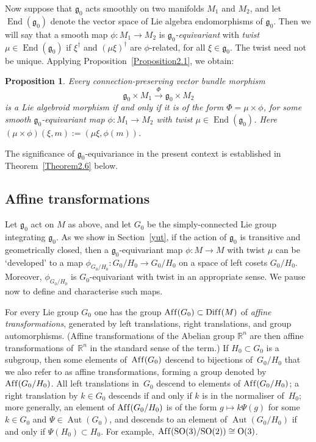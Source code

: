 \documentclass[pdftex]{sigma}
\DeclareMathOperator{\affine}{Af\/f}
\DeclareMathOperator{\diff}{Dif\/f}
\DeclareMathOperator{\automorphism}{Aut}
\DeclareMathOperator{\selfmorphism}{End}
\numberwithin{equation}{section}
\newtheorem{PropositionBlaom}[TheoremBlaom]{Proposition}
 { \theoremstyle{definition}
\newtheorem{CounterexampleBlaom}[TheoremBlaom]{Counterexample}
\newtheorem{RemarkBlaom}[TheoremBlaom]{Remark} }
\begin{document}
Now suppose that ${\mathfrak g}_0 $ acts smoothly on two manifolds
$M_1$ and $M_2$, and let $\selfmorphism({\mathfrak g}_0)$ denote the
vector space of Lie algebra endomorphisms of ${\mathfrak g}_0$. Then
we will say that a smooth map $\phi \colon M_1 \rightarrow M_2$ is
{\it ${\mathfrak g}_0$-equivariant} with {\it twist
  $\mu\in\selfmorphism({\mathfrak g}_0)$} if $\xi^\dagger$ and $(\mu
\xi)^\dagger$ are $\phi $-related, for all $\xi\in {\mathfrak g}_0
$. The twist need not be unique.  Applying Proposition~\ref{Proposition2.1}, we
obtain:

\begin{PropositionBlaom}\label{Proposition2.2}
  Every connection-preserving vector bundle morphism
  \[
  {\mathfrak g}_0
  \times M_1 \xrightarrow{\Phi} {\mathfrak g}_0 \times M_2
  \]
 is a Lie
  algebroid morphism if and only if it is of the form $\Phi=\mu \times
  \phi$, for some smooth ${\mathfrak g}_0$-equivariant map $\phi
  \colon M_1 \rightarrow M_2$ with twist $\mu \in
  \selfmorphism({\mathfrak g}_0)$. Here $(\mu \times \phi)(\xi,m):=(\mu \xi,\phi(m))$.
\end{PropositionBlaom}


The signif\/icance of ${\mathfrak g}_0$-equivariance in the present
context is established in Theorem~\ref{Theorem2.6} below.

\subsection{Af\/f\/ine transformations}\label{affine}
Let ${\mathfrak g}_0$ act on $M$ as above, and let $G_0$ be the
simply-connected Lie group integrating ${\mathfrak g}_0$. As we show
in Section~\ref{yut}, if the action of ${\mathfrak g}_0$ is transitive and
geometrically closed, then a ${\mathfrak g}_0$-equivariant map $\phi
\colon M \rightarrow M$ with twist $\mu$ can be `developed' to a map
$\phi_{G_0/H_0} \colon G_0/H_0 \rightarrow G_0/H_0$ on a space of left
cosets $G_0/H_0$. Moreover, $\phi_{G_0/H_0}$ is $G_0$-equivariant with
twist in an appropriate sense. We pause now to def\/ine and characterise
such maps.

For every Lie group $G_0$ one has the group $\affine(G_0)\subset
\diff(M)$ of {\it affine transformations}, generated by left
translations, right translations, and group automorphisms. (Af\/f\/ine
transformations of the Abelian group ${\mathbb R}^n$ are then af\/f\/ine
transformations of~${\mathbb R}^n $ in the standard sense of the
term.) If $H_0 \subset G_0$ is a subgroup, then some elements of~$\affine(G_0)$ descend to bijections of~$G_0/H_0$ that we also refer
to as af\/f\/ine transformations, forming a group denoted by
$\affine(G_0/H_0)$. All left translations in~$G_0$ descend to elements
of $\affine(G_0/H_0)$; a right translation by $k \in G_0$ descends if
and only if $k$ is in the normaliser of~$H_0$; more generally, an
element of $\affine(G_0/H_0)$ is of the form $g \mapsto k\Psi(g)$ for
some $k \in G_0$ and $\Psi \in \automorphism(G_0)$, and descends to an
element of $\automorphism(G_0/H_0)$ if and only if $\Psi(H_0) \subset
H_0$. For example, $\affine({\rm SO}(3)/{\rm SO}(2))\cong
{\rm O}(3)$.
\end{document}
